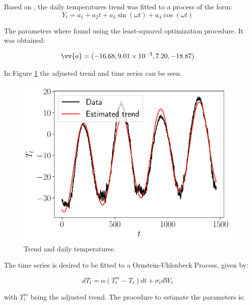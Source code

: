 \documentclass[11pt]{article}
\theoremstyle{definition}
\theoremstyle{remark}
\theoremstyle{remark}
\begin{document}
Based on \parencite{alaton2002}, the daily temperatures trend was
fitted to a process of the form:
\begin{equation*}
  Y_t = a_1 + a_2t + a_3\sin(\omega t) + a_4\cos(\omega t)
\end{equation*}

The parameters where found using the least-squared optimization
procedure. It was obtained:

\begin{equation*}
  \vv{a} = (-16.68, 9.01 \times 10^{-3}, 7.20, -18.87)
\end{equation*}

In Figure \ref{fig:trend} the adjusted trend and time series can be
seen.

\begin{figure}
  \centering
  \includegraphics[scale=.5]{sine_trend.pdf}
  \caption{Trend and daily temperatures.}
  \label{fig:trend}
\end{figure}

The time series is desired to be fitted to a Ornstein-Uhlenbeck
Process, given by:

\begin{equation*}
  dT_t = \alpha(T_t^m - T_t)dt + \sigma_t dW_t
\end{equation*}

with $T_t^m$ being the adjusted trend. The procedure to estimate the
parameters is:
\end{document}
